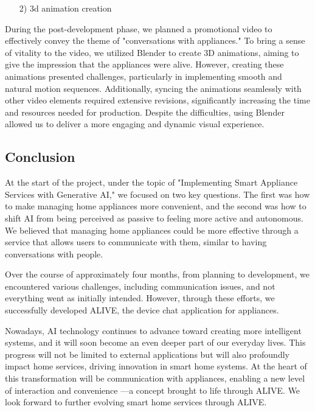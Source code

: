 \documentclass[conference]{IEEEtran}
\begin{document}
\begin{enumerate}
    \item [2)] 3d animation creation
\end{enumerate}
     \hspace{0.3em} During the post-development phase, we planned a promotional video to effectively convey the theme of "conversations with appliances." To bring a sense of vitality to the video, we utilized Blender to create 3D animations, aiming to give the impression that the appliances were alive. However, creating these animations presented challenges, particularly in implementing smooth and natural motion sequences. Additionally, syncing the animations seamlessly with other video elements required extensive revisions, significantly increasing the time and resources needed for production. Despite the difficulties, using Blender allowed us to deliver a more engaging and dynamic visual experience.


\subsection{Conclusion}
\hspace{0.3em} At the start of the project, under the topic of "Implementing Smart Appliance Services with Generative AI," we focused on two key questions. The first was how to make managing home appliances more convenient, and the second was how to shift AI from being perceived as passive to feeling more active and autonomous. We believed that managing home appliances could be more effective through a service that allows users to communicate with them, similar to having conversations with people.

\hspace{0.3em} Over the course of approximately four months, from planning to development, we encountered various challenges, including communication issues, and not everything went as initially intended. However, through these efforts, we successfully developed ALIVE, the device chat application for appliances.

\hspace{0.3em} Nowadays, AI technology continues to advance toward creating more intelligent systems, and it will soon become an even deeper part of our everyday lives. This progress will not be limited to external applications but will also profoundly impact home services, driving innovation in smart home systems. At the heart of this transformation will be communication with appliances, enabling a new level of interaction and convenience —a concept brought to life through ALIVE. We look forward to further evolving smart home services through ALIVE. 
\end{document}
